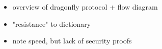 
\begin{itemize}
    \item overview of dragonfly protocol + flow diagram
    \item "resistance" to dictionary
    \item note speed, but lack of security proofs
\end{itemize}
